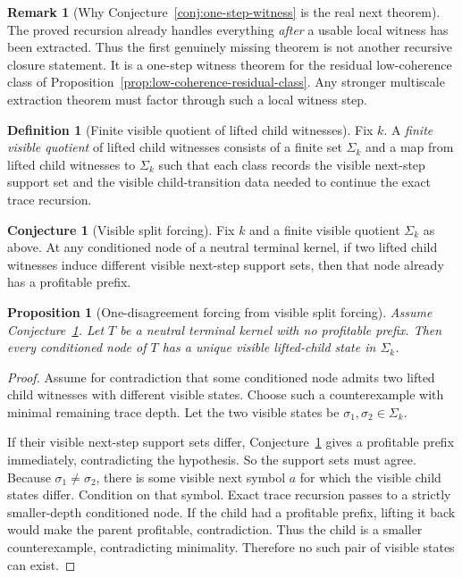 \documentclass[11pt]{article}
\newtheorem{proposition}[theorem]{Proposition}
\theoremstyle{definition}
\newtheorem{definition}[theorem]{Definition}
\newtheorem{conjecture}[theorem]{Conjecture}
\newtheorem{remark}[theorem]{Remark}
\newcommand{\1}{\mathbf{1}}
\begin{document}
\begin{remark}[Why Conjecture~\ref{conj:one-step-witness} is the real next theorem]\label{rem:one-step-witness-minimal}
The proved recursion already handles everything \emph{after} a usable local witness has been extracted.
Thus the first genuinely missing theorem is not another recursive closure statement.
It is a one-step witness theorem for the residual low-coherence class of Proposition~\ref{prop:low-coherence-residual-class}.
Any stronger multiscale extraction theorem must factor through such a local witness step.
\end{remark}

\begin{definition}[Finite visible quotient of lifted child witnesses]\label{def:visible-witness-quotient}
Fix $k$.
A \emph{finite visible quotient} of lifted child witnesses consists of a finite set $\Sigma_k$ and a map from lifted child witnesses to $\Sigma_k$ such that each class records the visible next-step support set and the visible child-transition data needed to continue the exact trace recursion.
\end{definition}

\begin{conjecture}[Visible split forcing]\label{conj:visible-split-forcing}
Fix $k$ and a finite visible quotient $\Sigma_k$ as above.
At any conditioned node of a neutral terminal kernel, if two lifted child witnesses induce different visible next-step support sets, then that node already has a profitable prefix.
\end{conjecture}

\begin{proposition}[One-disagreement forcing from visible split forcing]\label{prop:visible-split-to-coherence}
Assume Conjecture~\ref{conj:visible-split-forcing}.
Let $T$ be a neutral terminal kernel with no profitable prefix.
Then every conditioned node of $T$ has a unique visible lifted-child state in $\Sigma_k$.
\end{proposition}

\begin{proof}
Assume for contradiction that some conditioned node admits two lifted child witnesses with different visible states.
Choose such a counterexample with minimal remaining trace depth.
Let the two visible states be $\sigma_1,\sigma_2\in \Sigma_k$.

If their visible next-step support sets differ, Conjecture~\ref{conj:visible-split-forcing} gives a profitable prefix immediately, contradicting the hypothesis.
So the support sets must agree.
Because $\sigma_1\ne \sigma_2$, there is some visible next symbol $a$ for which the visible child states differ.
Condition on that symbol.
Exact trace recursion passes to a strictly smaller-depth conditioned node.
If the child had a profitable prefix, lifting it back would make the parent profitable, contradiction.
Thus the child is a smaller counterexample, contradicting minimality.
Therefore no such pair of visible states can exist.
\end{proof}
\end{document}
